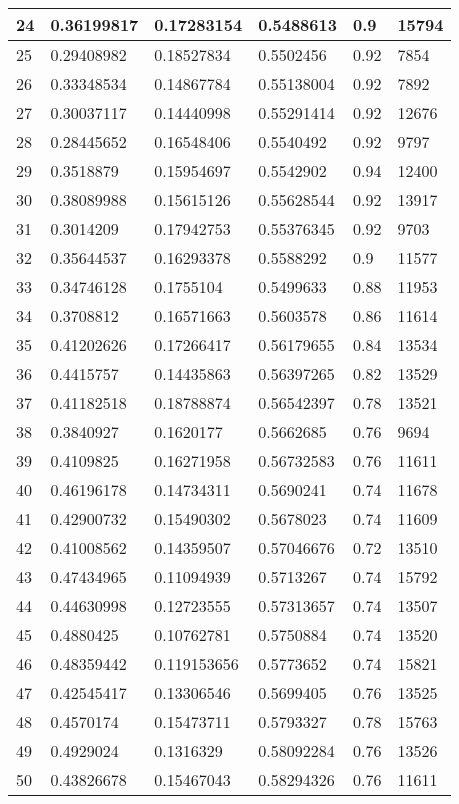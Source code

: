 \begin{longtable}{|l|l|l|l|l|l|}
24 & 0.36199817 & 0.17283154 & 0.5488613 & 0.9 & 15794 \\ \hline 
25 & 0.29408982 & 0.18527834 & 0.5502456 & 0.92 & 7854 \\ \hline 
26 & 0.33348534 & 0.14867784 & 0.55138004 & 0.92 & 7892 \\ \hline 
27 & 0.30037117 & 0.14440998 & 0.55291414 & 0.92 & 12676 \\ \hline 
28 & 0.28445652 & 0.16548406 & 0.5540492 & 0.92 & 9797 \\ \hline 
29 & 0.3518879 & 0.15954697 & 0.5542902 & 0.94 & 12400 \\ \hline 
30 & 0.38089988 & 0.15615126 & 0.55628544 & 0.92 & 13917 \\ \hline 
31 & 0.3014209 & 0.17942753 & 0.55376345 & 0.92 & 9703 \\ \hline 
32 & 0.35644537 & 0.16293378 & 0.5588292 & 0.9 & 11577 \\ \hline 
33 & 0.34746128 & 0.1755104 & 0.5499633 & 0.88 & 11953 \\ \hline 
34 & 0.3708812 & 0.16571663 & 0.5603578 & 0.86 & 11614 \\ \hline 
35 & 0.41202626 & 0.17266417 & 0.56179655 & 0.84 & 13534 \\ \hline 
36 & 0.4415757 & 0.14435863 & 0.56397265 & 0.82 & 13529 \\ \hline 
37 & 0.41182518 & 0.18788874 & 0.56542397 & 0.78 & 13521 \\ \hline 
38 & 0.3840927 & 0.1620177 & 0.5662685 & 0.76 & 9694 \\ \hline 
39 & 0.4109825 & 0.16271958 & 0.56732583 & 0.76 & 11611 \\ \hline 
40 & 0.46196178 & 0.14734311 & 0.5690241 & 0.74 & 11678 \\ \hline 
41 & 0.42900732 & 0.15490302 & 0.5678023 & 0.74 & 11609 \\ \hline 
42 & 0.41008562 & 0.14359507 & 0.57046676 & 0.72 & 13510 \\ \hline 
43 & 0.47434965 & 0.11094939 & 0.5713267 & 0.74 & 15792 \\ \hline 
44 & 0.44630998 & 0.12723555 & 0.57313657 & 0.74 & 13507 \\ \hline 
45 & 0.4880425 & 0.10762781 & 0.5750884 & 0.74 & 13520 \\ \hline 
46 & 0.48359442 & 0.119153656 & 0.5773652 & 0.74 & 15821 \\ \hline 
47 & 0.42545417 & 0.13306546 & 0.5699405 & 0.76 & 13525 \\ \hline 
48 & 0.4570174 & 0.15473711 & 0.5793327 & 0.78 & 15763 \\ \hline 
49 & 0.4929024 & 0.1316329 & 0.58092284 & 0.76 & 13526 \\ \hline 
50 & 0.43826678 & 0.15467043 & 0.58294326 & 0.76 & 11611 \\ \hline 
\end{longtable}